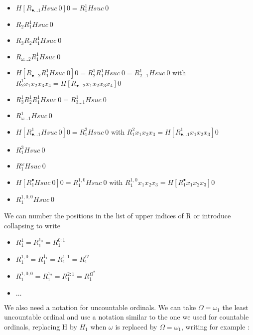 \documentclass[10pt]{article}
\begin{document}
\begin{itemize}
     \setlength{\itemsep}{1pt}
     \setlength{\parskip}{0pt}
     \setlength{\parsep}{0pt}
\item \( H [R_{\bullet \ldots 1} H suc\ 0] 0 = R^1_1 H suc\ 0 \)
\item \( R_2 R^1_1 H suc\ 0 \)
\item \( R_3 R_2 R^1_1 H suc\ 0 \)
\item \( R_{\omega \ldots 2} R^1_1 H suc\ 0 \)
\item \( H [R_{\bullet \ldots 2} R^1_1 H suc\ 0] 0 = R^1_2 R^1_1 H suc\ 0 = R^1_{2 \ldots 1} H suc\ 0 \) with \( R^1_2 x_1 x_2 x_3 x_4 = H [R_{\bullet \ldots 2} x_1 x_2 x_3 x_4] 0 \) 
\item \( R^1_3 R^1_2 R^1_1 H suc\ 0 = R^1_{3 \ldots 1} H suc\ 0 \)
\item \( R^1_{\omega \ldots 1} H suc\ 0 \)
\item \( H [R^1_{\bullet \ldots 1} H suc\ 0] 0 = R^2_1 H suc\ 0 \) with \( R^2_1 x_1 x_2 x_3 = H [R^1_ {\bullet \ldots 1} x_1 x_2 x_3] 0 \)
\item \( R^3_1 H suc\ 0 \)
\item \( R^\omega_1 H suc\ 0 \)
\item \( H [R^\bullet_1 H suc\ 0] 0 = R^{1,0}_1 H suc\ 0 \) with \( R^{1,0}_1 x_1 x_2 x_3 = H [R^\bullet_1 x_1 x_2 x_3] 0 \)
\item \( R^{1,0,0}_1 H suc\ 0 \)

\end{itemize}

We can number the positions in the list of upper indices of R or introduce collapsing to write

\begin{itemize}
     \setlength{\itemsep}{1pt}
     \setlength{\parskip}{0pt}
     \setlength{\parsep}{0pt}
\item \( R^1_1 = R^{1_0}_1 = R^{0:1}_1 \)
\item \( R^{1,0}_1 = R^{1_1}_1 = R^{1:1}_1 = R^\Omega_1 \)
\item \( R^{1,0,0}_1 = R^{1_2}_1 = R^{2:1}_1 = R^{\Omega^2}_1 \)
\item \( \ldots \)
\end{itemize}

We also need a notation for uncountable ordinals. We can take \( \Omega = \omega_1 \) the least uncountable ordinal and  use a notation similar to the one we used for countable ordinals, replacing H by \( H_1 \) when \( \omega \) is replaced by \( \Omega = \omega_1 \), writing for example :
\end{document}
